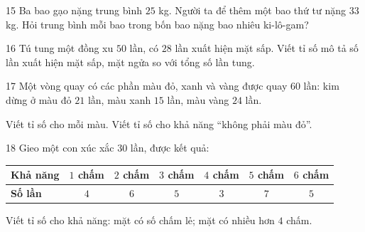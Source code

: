 \gap
\begin{probbox}{15}{\relax}
Ba bao gạo nặng trung bình $25$ kg. Người ta để thêm một bao thứ tư nặng $33$ kg. Hỏi trung bình mỗi bao trong bốn bao nặng bao nhiêu ki-lô-gam?
\end{probbox}
\gap
\begin{probbox}{16}{\relax}
Tú tung một đồng xu $50$ lần, có $28$ lần xuất hiện mặt sấp. Viết tỉ số mô tả số lần xuất hiện mặt sấp, mặt ngửa so với tổng số lần tung.
\end{probbox}
\gap
\begin{probbox}{17}{\relax}
Một vòng quay có các phần màu đỏ, xanh và vàng được quay $60$ lần: kim dừng ở màu đỏ $21$ lần, màu xanh $15$ lần, màu vàng $24$ lần.\par
{} Viết tỉ số cho mỗi màu. \quad {} Viết tỉ số cho khả năng ``không phải màu đỏ''.
\end{probbox}
\gap
\needspace{5cm}
\begin{probbox}{18}{\relax}
Gieo một con xúc xắc $30$ lần, được kết quả:
\begin{center}
\begin{tabular}{|l|c|c|c|c|c|c|}
\hline
\textbf{Khả năng} & $1$ chấm & $2$ chấm & $3$ chấm & $4$ chấm & $5$ chấm & $6$ chấm\\\hline
\textbf{Số lần} & $4$ & $6$ & $5$ & $3$ & $7$ & $5$\\\hline
\end{tabular}
\end{center}
Viết tỉ số cho khả năng:  mặt có số chấm lẻ; \quad {} mặt có nhiều hơn $4$ chấm.
\end{probbox}
